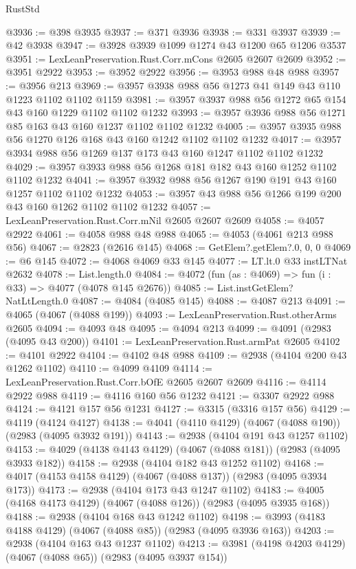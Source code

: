 \begin{lexlean}{RustStd}
\begin{coremodule}
@3936 := @398 @3935
@3937 := @371 @3936
@3938 := @331 @3937
@3939 := @42 @3938
@3947 := @3928 @3939 @1099 @1274 @43 @1200 @65 @1206 @3537
@3951 := LexLeanPreservation.Rust.Corr.mCons @2605 @2607 @2609
@3952 := @3951 @2922
@3953 := @3952 @2922
@3956 := @3953 @988 @48 @988
@3957 := @3956 @213
@3969 := @3957 @3938 @988 @56 @1273 @41 @149 @43 @110 @1223 @1102 @1102 @1159
@3981 := @3957 @3937 @988 @56 @1272 @65 @154 @43 @160 @1229 @1102 @1102 @1232
@3993 := @3957 @3936 @988 @56 @1271 @85 @163 @43 @160 @1237 @1102 @1102 @1232
@4005 := @3957 @3935 @988 @56 @1270 @126 @168 @43 @160 @1242 @1102 @1102 @1232
@4017 := @3957 @3934 @988 @56 @1269 @137 @173 @43 @160 @1247 @1102 @1102 @1232
@4029 := @3957 @3933 @988 @56 @1268 @181 @182 @43 @160 @1252 @1102 @1102 @1232
@4041 := @3957 @3932 @988 @56 @1267 @190 @191 @43 @160 @1257 @1102 @1102 @1232
@4053 := @3957 @43 @988 @56 @1266 @199 @200 @43 @160 @1262 @1102 @1102 @1232
@4057 := LexLeanPreservation.Rust.Corr.mNil @2605 @2607 @2609
@4058 := @4057 @2922
@4061 := @4058 @988 @48 @988
@4065 := @4053 (@4061 @213 @988 @56)
@4067 := @2823 (@2616 @145)
@4068 := GetElem?.getElem?.{0, 0, 0}
@4069 := @6 @145
@4072 := @4068 @4069 @33 @145
@4077 := LT.lt.{0} @33 instLTNat @2632
@4078 := List.length.{0}
@4084 := @4072 (fun (as : @4069) => fun (i : @33) => @4077 (@4078 @145 @2676))
@4085 := List.instGetElem?NatLtLength.{0}
@4087 := @4084 (@4085 @145)
@4088 := @4087 @213
@4091 := @4065 (@4067 (@4088 @199))
@4093 := LexLeanPreservation.Rust.otherArms @2605
@4094 := @4093 @48
@4095 := @4094 @213
@4099 := @4091 (@2983 (@4095 @43 @200))
@4101 := LexLeanPreservation.Rust.armPat @2605
@4102 := @4101 @2922
@4104 := @4102 @48 @988
@4109 := @2938 (@4104 @200 @43 @1262 @1102)
@4110 := @4099 @4109
@4114 := LexLeanPreservation.Rust.Corr.bOfE @2605 @2607 @2609
@4116 := @4114 @2922 @988
@4119 := @4116 @160 @56 @1232
@4121 := @3307 @2922 @988
@4124 := @4121 @157 @56 @1231
@4127 := @3315 (@3316 @157 @56)
@4129 := @4119 (@4124 @4127)
@4138 := @4041 (@4110 @4129) (@4067 (@4088 @190)) (@2983 (@4095 @3932 @191))
@4143 := @2938 (@4104 @191 @43 @1257 @1102)
@4153 := @4029 (@4138 @4143 @4129) (@4067 (@4088 @181)) (@2983 (@4095 @3933 @182))
@4158 := @2938 (@4104 @182 @43 @1252 @1102)
@4168 := @4017 (@4153 @4158 @4129) (@4067 (@4088 @137)) (@2983 (@4095 @3934 @173))
@4173 := @2938 (@4104 @173 @43 @1247 @1102)
@4183 := @4005 (@4168 @4173 @4129) (@4067 (@4088 @126)) (@2983 (@4095 @3935 @168))
@4188 := @2938 (@4104 @168 @43 @1242 @1102)
@4198 := @3993 (@4183 @4188 @4129) (@4067 (@4088 @85)) (@2983 (@4095 @3936 @163))
@4203 := @2938 (@4104 @163 @43 @1237 @1102)
@4213 := @3981 (@4198 @4203 @4129) (@4067 (@4088 @65)) (@2983 (@4095 @3937 @154))

\end{coremodule}
\end{lexlean}
